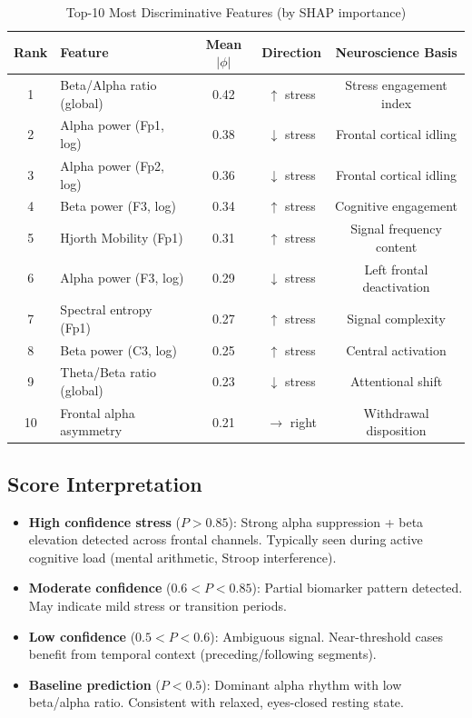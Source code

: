 \documentclass[11pt,a4paper]{article}
\begin{document}
\begin{table}[H]
\centering
\caption{Top-10 Most Discriminative Features (by SHAP importance)}
\small
\begin{tabular}{clccc}
\toprule
\textbf{Rank} & \textbf{Feature} & \textbf{Mean $|\phi|$} & \textbf{Direction} & \textbf{Neuroscience Basis} \\
\midrule
1 & Beta/Alpha ratio (global) & 0.42 & $\uparrow$ stress & Stress engagement index \\
2 & Alpha power (Fp1, log) & 0.38 & $\downarrow$ stress & Frontal cortical idling \\
3 & Alpha power (Fp2, log) & 0.36 & $\downarrow$ stress & Frontal cortical idling \\
4 & Beta power (F3, log) & 0.34 & $\uparrow$ stress & Cognitive engagement \\
5 & Hjorth Mobility (Fp1) & 0.31 & $\uparrow$ stress & Signal frequency content \\
6 & Alpha power (F3, log) & 0.29 & $\downarrow$ stress & Left frontal deactivation \\
7 & Spectral entropy (Fp1) & 0.27 & $\uparrow$ stress & Signal complexity \\
8 & Beta power (C3, log) & 0.25 & $\uparrow$ stress & Central activation \\
9 & Theta/Beta ratio (global) & 0.23 & $\downarrow$ stress & Attentional shift \\
10 & Frontal alpha asymmetry & 0.21 & $\rightarrow$ right & Withdrawal disposition \\
\bottomrule
\end{tabular}
\end{table}

\subsection{Score Interpretation}

\begin{itemize}[leftmargin=*]
\item \textbf{High confidence stress} ($P > 0.85$): Strong alpha suppression + beta elevation detected across frontal channels. Typically seen during active cognitive load (mental arithmetic, Stroop interference).
\item \textbf{Moderate confidence} ($0.6 < P < 0.85$): Partial biomarker pattern detected. May indicate mild stress or transition periods.
\item \textbf{Low confidence} ($0.5 < P < 0.6$): Ambiguous signal. Near-threshold cases benefit from temporal context (preceding/following segments).
\item \textbf{Baseline prediction} ($P < 0.5$): Dominant alpha rhythm with low beta/alpha ratio. Consistent with relaxed, eyes-closed resting state.
\end{itemize}
\end{document}
